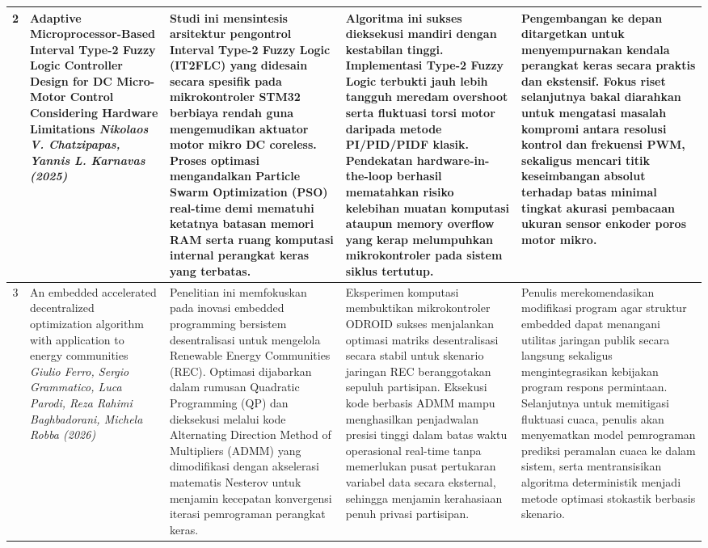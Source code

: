 \documentclass[11pt,a4paper]{article}
\begin{document}
\begin{small}
\begin{longtable}{|c|>{\raggedright\arraybackslash}p{3.2cm}|>{\raggedright\arraybackslash}p{4cm}|>{\raggedright\arraybackslash}p{4cm}|>{\raggedright\arraybackslash}p{4cm}|}
\hline
2 & Adaptive Microprocessor-Based Interval Type-2 Fuzzy Logic Controller Design for DC Micro-Motor Control Considering Hardware Limitations \newline \newline \textit{Nikolaos V. Chatzipapas, Yannis L. Karnavas (2025)} & Studi ini mensintesis arsitektur pengontrol Interval Type-2 Fuzzy Logic (IT2FLC) yang didesain secara spesifik pada mikrokontroler STM32 berbiaya rendah guna mengemudikan aktuator motor mikro DC coreless. Proses optimasi mengandalkan Particle Swarm Optimization (PSO) real-time demi mematuhi ketatnya batasan memori RAM serta ruang komputasi internal perangkat keras yang terbatas. & Algoritma ini sukses dieksekusi mandiri dengan kestabilan tinggi. Implementasi Type-2 Fuzzy Logic terbukti jauh lebih tangguh meredam overshoot serta fluktuasi torsi motor daripada metode PI/PID/PIDF klasik. Pendekatan hardware-in-the-loop berhasil mematahkan risiko kelebihan muatan komputasi ataupun memory overflow yang kerap melumpuhkan mikrokontroler pada sistem siklus tertutup. & Pengembangan ke depan ditargetkan untuk menyempurnakan kendala perangkat keras secara praktis dan ekstensif. Fokus riset selanjutnya bakal diarahkan untuk mengatasi masalah kompromi antara resolusi kontrol dan frekuensi PWM, sekaligus mencari titik keseimbangan absolut terhadap batas minimal tingkat akurasi pembacaan ukuran sensor enkoder poros motor mikro. \\
\hline

3 & An embedded accelerated decentralized optimization algorithm with application to energy communities \newline \newline \textit{Giulio Ferro, Sergio Grammatico, Luca Parodi, Reza Rahimi Baghbadorani, Michela Robba (2026)} & Penelitian ini memfokuskan pada inovasi embedded programming bersistem desentralisasi untuk mengelola Renewable Energy Communities (REC). Optimasi dijabarkan dalam rumusan Quadratic Programming (QP) dan dieksekusi melalui kode Alternating Direction Method of Multipliers (ADMM) yang dimodifikasi dengan akselerasi matematis Nesterov untuk menjamin kecepatan konvergensi iterasi pemrograman perangkat keras. & Eksperimen komputasi membuktikan mikrokontroler ODROID sukses menjalankan optimasi matriks desentralisasi secara stabil untuk skenario jaringan REC beranggotakan sepuluh partisipan. Eksekusi kode berbasis ADMM mampu menghasilkan penjadwalan presisi tinggi dalam batas waktu operasional real-time tanpa memerlukan pusat pertukaran variabel data secara eksternal, sehingga menjamin kerahasiaan penuh privasi partisipan. & Penulis merekomendasikan modifikasi program agar struktur embedded dapat menangani utilitas jaringan publik secara langsung sekaligus mengintegrasikan kebijakan program respons permintaan. Selanjutnya untuk memitigasi fluktuasi cuaca, penulis akan menyematkan model pemrograman prediksi peramalan cuaca ke dalam sistem, serta mentransisikan algoritma deterministik menjadi metode optimasi stokastik berbasis skenario. \\
\hline


\end{longtable}
\end{small}
\end{document}
